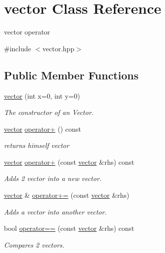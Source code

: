 \hypertarget{classvector}{}\section{vector Class Reference}
\label{classvector}


vector operator  




{\ttfamily \#include $<$vector.\+hpp$>$}

\subsection*{Public Member Functions}
\begin{DoxyCompactItemize}
\item 
\hyperlink{classvector_ada69c108ec9393e6f70bdfcd58366cbf}{vector} (int x=0, int y=0)
\begin{DoxyCompactList}\small\item\em The constructor of an Vector. \end{DoxyCompactList}\item 
\hyperlink{classvector}{vector} \hyperlink{classvector_a9af16b41f973cd073b089bf5371e8a70}{operator+} () const
\begin{DoxyCompactList}\small\item\em returns himself vector \end{DoxyCompactList}\item 
\hyperlink{classvector}{vector} \hyperlink{classvector_a9d639bc53d77f17c6ba3af1dd9549424}{operator+} (const \hyperlink{classvector}{vector} \&rhs) const
\begin{DoxyCompactList}\small\item\em Adds 2 vector into a new vector. \end{DoxyCompactList}\item 
\hyperlink{classvector}{vector} \& \hyperlink{classvector_a401c12597814627f350a8cd663b6dba5}{operator+=} (const \hyperlink{classvector}{vector} \&rhs)
\begin{DoxyCompactList}\small\item\em Adds a vector into another vector. \end{DoxyCompactList}\item 
bool \hyperlink{classvector_a0066b879f704f7d344ec9cd2a2f57ea3}{operator==} (const \hyperlink{classvector}{vector} \&rhs) const
\begin{DoxyCompactList}\small\item\em Compares 2 vectors. \end{DoxyCompactList}\item 

\end{DoxyCompactItemize}
